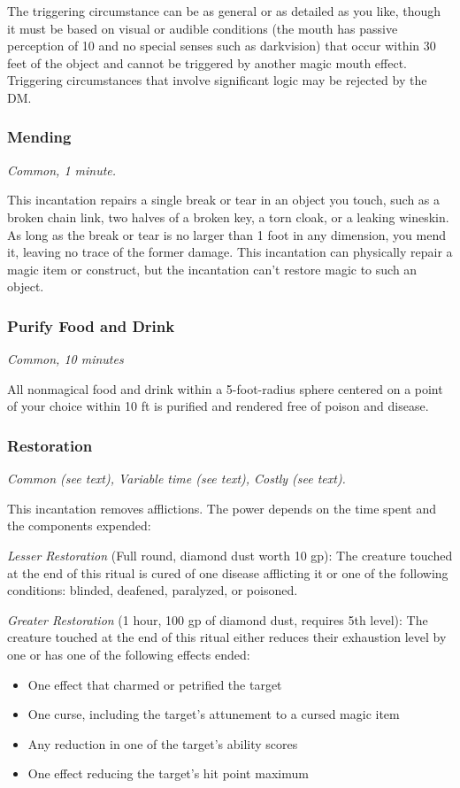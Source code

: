 The triggering circumstance can be as general or as detailed as you like, though it must be based on visual or audible conditions (the mouth has passive perception of 10 and no special senses such as darkvision) that occur within 30 feet of the object and cannot be triggered by another magic mouth effect. Triggering circumstances that involve significant logic may be rejected by the DM.

\subsubsection{Mending}
\textit{Common, 1 minute.}

This incantation repairs a single break or tear in an object you touch, such as a broken chain link, two halves of a broken key, a torn cloak, or a leaking wineskin. As long as the break or tear is no larger than 1 foot in any dimension, you mend it, leaving no trace of the former damage. This incantation can physically repair a magic item or construct, but the incantation can't restore magic to such an object.

\subsubsection{Purify Food and Drink}
\textit{Common, 10 minutes}

All nonmagical food and drink within a 5-foot-radius sphere centered on a point of your choice within 10 ft is purified and rendered free of poison and disease.

\subsubsection{Restoration}
\textit{Common (see text), Variable time (see text), Costly (see text).}

This incantation removes afflictions. The power depends on the time spent and the components expended:

\textit{Lesser Restoration} (Full round, diamond dust worth 10 gp): The creature touched at the end of this ritual is cured of one disease afflicting it or one of the following conditions: blinded, deafened, paralyzed, or poisoned.

\textit{Greater Restoration} (1 hour, 100 gp of diamond dust, requires 5th level): The creature touched at the end of this ritual either reduces their exhaustion level by one or has one of the following effects ended:
\begin{itemize}
\item One effect that charmed or petrified the target
\item One curse, including the target's attunement to a cursed magic item
\item Any reduction in one of the target's ability scores
\item One effect reducing the target's hit point maximum
\end{itemize}

